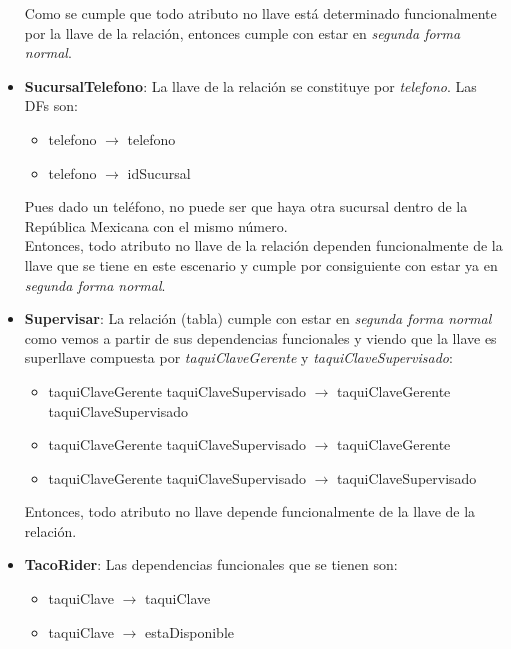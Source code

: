\documentclass[11pt,letterpaper]{article}
\begin{document}
\begin{itemize}
\begin{itemize}
\end{itemize}

Como se cumple que todo atributo no llave está determinado funcionalmente por la llave de la relación, entonces cumple con estar en \textit{segunda forma normal}.
\item \textbf{SucursalTelefono}: La llave de la relación se constituye por \textit{telefono}. Las DFs son:

\begin{itemize}
\item telefono $\rightarrow$ telefono

\item telefono  $\rightarrow$ idSucursal

\end{itemize}

Pues dado un teléfono, no puede ser que haya otra sucursal dentro de la República Mexicana con el mismo número.\\

Entonces, todo atributo no llave de la relación dependen funcionalmente de la llave que se tiene en este escenario y cumple por consiguiente con estar ya en \textit{segunda forma normal}.
\item \textbf{Supervisar}: La relación (tabla) cumple con estar en \textit{segunda forma normal} como vemos a partir de sus dependencias funcionales y viendo que la llave es superllave compuesta por \textit{taquiClaveGerente} y \textit{taquiClaveSupervisado}:

\begin{itemize}
\item taquiClaveGerente taquiClaveSupervisado $\rightarrow$ taquiClaveGerente taquiClaveSupervisado

\item taquiClaveGerente taquiClaveSupervisado $\rightarrow$ taquiClaveGerente 
\item taquiClaveGerente taquiClaveSupervisado $\rightarrow$ taquiClaveSupervisado

\end{itemize}

Entonces, todo atributo no llave depende funcionalmente de la llave de la relación.
\item \textbf{TacoRider}: Las dependencias funcionales que se tienen son:
\begin{itemize}
\item taquiClave $\rightarrow$ taquiClave

\item taquiClave $\rightarrow$ estaDisponible
\end{itemize}


\end{itemize}
\end{document}
